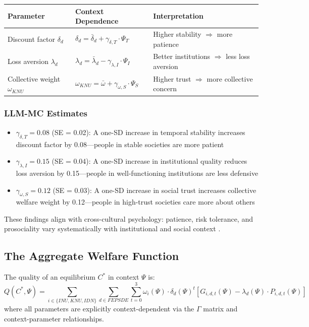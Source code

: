 \begin{center}
\renewcommand{\arraystretch}{1.3}
\begin{tabular}{lll}
\hline
\textbf{Parameter} & \textbf{Context Dependence} & \textbf{Interpretation} \\
\hline
Discount factor $\delta_d$ & $\delta_d = \bar{\delta}_d + \gamma_{\delta,T} \cdot \Psi_T$ & Higher stability $\Rightarrow$ more patience \\
Loss aversion $\lambda_d$ & $\lambda_d = \bar{\lambda}_d - \gamma_{\lambda,I} \cdot \Psi_I$ & Better institutions $\Rightarrow$ less loss aversion \\
Collective weight $\omega_{KNU}$ & $\omega_{KNU} = \bar{\omega} + \gamma_{\omega,S} \cdot \Psi_S$ & Higher trust $\Rightarrow$ more collective concern \\
\hline
\end{tabular}
\end{center}

\subsubsection{LLM-MC Estimates}

\begin{itemize}
  \item $\gamma_{\delta,T} = 0.08$ (SE = 0.02): A one-SD increase in temporal stability increases discount factor by 0.08---people in stable societies are more patient
  \item $\gamma_{\lambda,I} = 0.15$ (SE = 0.04): A one-SD increase in institutional quality reduces loss aversion by 0.15---people in well-functioning institutions are less defensive
  \item $\gamma_{\omega,S} = 0.12$ (SE = 0.03): A one-SD increase in social trust increases collective welfare weight by 0.12---people in high-trust societies care more about others
\end{itemize}

These findings align with cross-cultural psychology: patience, risk tolerance, and prosociality
vary systematically with institutional and social context \citep{enke2019globalpref}.

\subsection{The Aggregate Welfare Function}

\begin{definition}
The quality of an equilibrium $C^*$ in context $\Psi$ is:
\begin{equation}
  Q(C^*, \Psi) = \sum_{i \in \{INU, KNU, IDN\}} \sum_{d \in FEPSDE} \sum_{t=0}^{3} 
           \omega_i(\Psi) \cdot \delta_d(\Psi)^t \left[ G_{i,d,t}(\Psi) - \lambda_d(\Psi) \cdot P_{i,d,t}(\Psi) \right]
  \label{eq:eqquality-context}
\end{equation}
where all parameters are explicitly context-dependent via the $\Gamma$ matrix and context-parameter relationships.
\end{definition}


